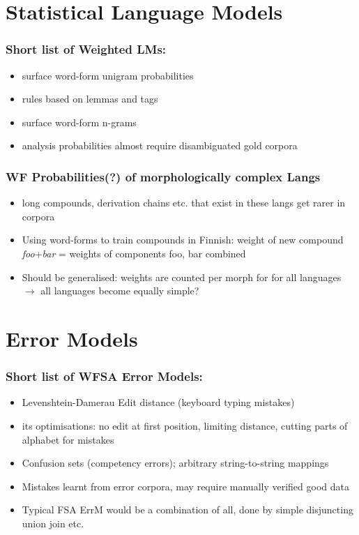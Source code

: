 \documentclass[t,12pt]{beamer}
\begin{document}
\section{Statistical Language Models}
\begin{frame}
    \frametitle{Short list of Weighted LMs:}
    \begin{itemize}
        \item surface word-form unigram probabilities
        \item rules based on lemmas and tags
        \item surface word-form n-grams
        \item analysis probabilities almost require disambiguated gold
            corpora
    \end{itemize}
\end{frame}

\begin{frame}
    \frametitle{WF Probabilities(?) of morphologically complex Langs}
    \begin{itemize}
        \item long compounds, derivation chains etc. that exist in these
            langs get rarer in corpora
        \item Using word-forms to train compounds in Finnish: 
            weight of new compound \emph{foo}+\emph{bar} = weights of components
            foo, bar combined~\cite{pirinen2009weighted,pirinen2009weighting}
        \item Should be generalised: weights are counted per morph for for
            all languages $\rightarrow$ all languages become equally simple?
    \end{itemize}
\end{frame}

\section{Error Models}

\begin{frame}
    \frametitle{Short list of WFSA Error Models:}
    \begin{itemize}
        \item Levenshtein-Damerau Edit distance (keyboard typing mistakes)
            \cite{pirinen2010finitestate}
        \item its optimisations: no edit at first position, limiting distance,
            cutting parts of alphabet for mistakes
            \cite{pirinen2012effects}
        \item Confusion sets (competency errors); arbitrary string-to-string
            mappings \cite{pirinen2010building}
        \item Mistakes learnt from error corpora, may require manually verified
            good data
        \item Typical FSA ErrM would be a combination of all, done by simple
            disjuncting union join etc.
    \end{itemize}
\end{frame}
\end{document}
